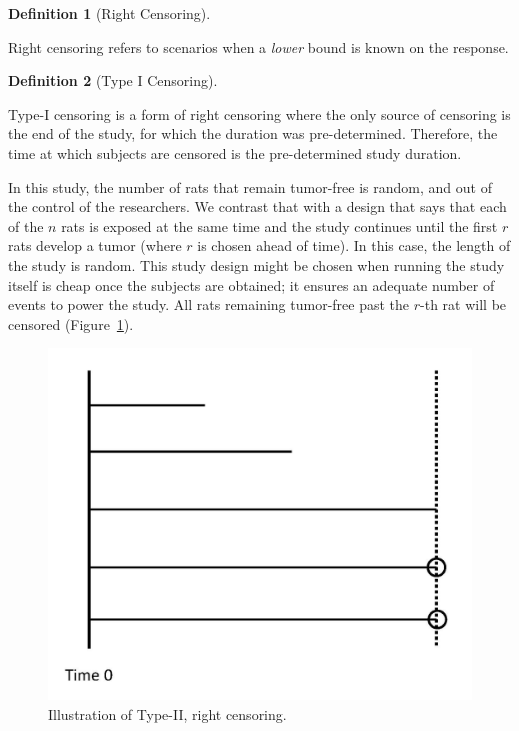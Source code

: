 \documentclass[
  letterpaper,
  DIV=11,
  numbers=noendperiod]{scrreprt}
\theoremstyle{definition}
\newtheorem{definition}{Definition}[chapter]
\theoremstyle{definition}
\theoremstyle{remark}
\begin{document}
\begin{definition}[Right
Censoring]\protect\hypertarget{def-right-censoring}{}\label{def-right-censoring}

Right censoring refers to scenarios when a \emph{lower} bound is known
on the response.

\end{definition}

\begin{definition}[Type I
Censoring]\protect\hypertarget{def-type-1-censoring}{}\label{def-type-1-censoring}

Type-I censoring is a form of right censoring where the only source of
censoring is the end of the study, for which the duration was
pre-determined. Therefore, the time at which subjects are censored is
the pre-determined study duration.

\end{definition}

In this study, the number of rats that remain tumor-free is random, and
out of the control of the researchers. We contrast that with a design
that says that each of the \(n\) rats is exposed at the same time and
the study continues until the first \(r\) rats develop a tumor (where
\(r\) is chosen ahead of time). In this case, the length of the study is
random. This study design might be chosen when running the study itself
is cheap once the subjects are obtained; it ensures an adequate number
of events to power the study. All rats remaining tumor-free past the
\(r\)-th rat will be censored (Figure~\ref{fig-surv-censoring-type-2}).

\begin{figure}

{\centering \includegraphics{./images/censoring-type-2.jpg}

}

\caption{\label{fig-surv-censoring-type-2}Illustration of Type-II, right
censoring.}

\end{figure}
\end{document}
